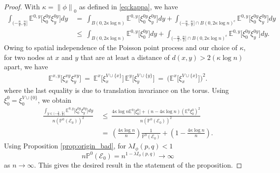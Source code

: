 \documentclass[letterpaper,11pt]{article}
\theoremstyle{definition}
\def\E{\mathbb{E}}
\def\P{\mathbb{P}}
\def\cE{\mathcal{E}}
\def\weq{ \ = \ }
\def\wle{ \ \le \ }
\newcommand{\zeronorm}[1]{{\lVert#1\rVert}_0}
\numberwithin{equation}{section}
\newcommand{\ka}{\kappa}
\newcommand{\la}{\lambda}
\theoremstyle{definition}
\def\E{\mathbb{E}}
\def\P{\mathbb{P}}
\def\cE{\mathcal{E}}
\def\weq{ \ = \ }
\def\wle{ \ \le \ }
\newcommand{\zeronorm}[1]{{\lVert#1\rVert}_0}
\numberwithin{equation}{section}
\newcommand{\ka}{\kappa}
\newcommand{\la}{\lambda}
\theoremstyle{thmstyletwo}%
\begin{document}
\begin{proof}
With $\ka = \zeronorm{\phi}$ as defined in \eqref{eq:kappa}, we have
\begin{align*}
\int_{(-\frac{n}{2}, \frac{n}{2}]}
\E^{0,y} \Big[ \xi^{0y}_0 \xi^{0y}_y \Big] dy
&\weq \int_{B\left(0,2\ka\log n\right)} \E^{0,y} \Big[ \xi^{0y}_0 \xi^{0y}_y \Big] dy
+ \int_{(-\frac{n}{2}, \frac{n}{2}] \cap B \left(0,2\ka\log n\right)^{\text{c}}}
\E^{0,y} \Big[ \xi^{0y}_0 \xi^{0y}_y \Big] dy\\
&\wle \int_{B\left(0,2\ka\log n\right)}
\E^{0,y} \Big[\xi^{0y}_0 \Big] dy
+ \int_{(-\frac{n}{2}, \frac{n}{2}] \cap B\left(0,2\ka\log n\right)^{\text{c}}}
\E^{0,y} \Big[ \xi^{0y}_0 \xi^{0y}_y \Big] dy.
\end{align*}
Owing to spatial independence of the Poisson point process and our choice of $\ka$, for two nodes at $x$ and $y$ that are at least a distance of $d(x,y) > 2\left(\ka\log n\right)$ apart, we have 
\begin{align*}
\E^{x,y} \Big[\xi^{xy}_x \xi^{xy}_y\Big]
\weq \E^{x} \Big[\xi^{V\cup \{x\}}_x\Big] \, \E^{y} \Big[\xi^{V\cup \{y\}}_y\Big]
\weq \Big(\E^{x} \Big[\xi^{V\cup \{x\}}_x\Big]\Big)^2.
\end{align*}
where the last equality is due to translation invariance on the torus. Using $\xi_0^0 = \xi_0^{V\cup\{0\}}$, we obtain
\begin{align*}
\frac{\int_{y \in (-\frac{n}{2}, \frac{n}{2}]} \E^{0,y} \Big[ \xi^{0y}_0 \xi^{0y}_y \Big] dy}
{n \left( \P^0(\cE_0) \right)^2}
&\wle \frac{4 \ka \log n \E^{0} \Big[ \xi_0^0 \Big]
+ \left(n - 4 \ka \log n \right) ( \E^{0} \xi_0^0 )^2}{n \left( \P^0(\cE_0) \right)^2} \\
&\weq \left(\frac{4 \ka \log n}{n} \right) \frac{1}{\P^0(\cE_0)}+\left(1-\frac{4\ka \log n}{n}\right).
\end{align*}
Using Proposition \ref{prop:origin_bad}, for $\la I_{\phi}(p,q) < 1$
\begin{equation}
n\P^0( \cE_0) = n^{1-\la I_{\phi}(p,q)} \rightarrow \infty 
\end{equation}
as $n \rightarrow \infty$. This gives the desired result in the statement of the proposition.
\end{proof}
\end{document}
